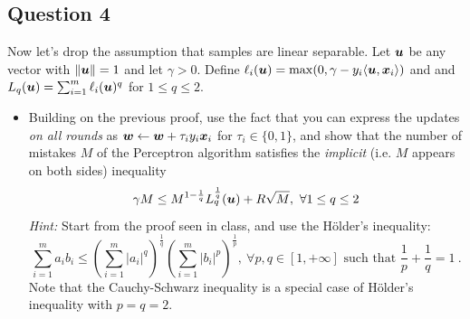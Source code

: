 \documentclass{article}
\begin{document}
\subsection{Question 4}
Now let's drop the assumption that samples are linear separable.
Let $\boldsymbol{u}$ be any vector with $\|\boldsymbol{u}\| = 1$ and let $\gamma > 0$. Define $\ell_i(\boldsymbol{u}) = \max(0, \gamma - y_i\langle \boldsymbol{u}, \boldsymbol{x}_i\rangle)$ and and $L_q(\boldsymbol{u})=\sum_{i=1}^m \ell_i(\boldsymbol{u})^q$ for $1\leq q\leq 2$.
\begin{itemize}
\item Building on the previous proof, use the fact that you can express the updates \emph{on all rounds} as $\boldsymbol{w}\leftarrow \boldsymbol{w} + \tau_i y_i \boldsymbol{x}_i$ for $\tau_i \in \{0,1\}$, and show that the number of mistakes $M$ of the Perceptron algorithm satisfies the \emph{implicit} (i.e. $M$ appears on both sides) inequality
\begin{equation}
\label{eq:implicit_M}
\gamma M\leq M^{1-\frac{1}{q}} L^\frac{1}{q}_q(\bu) + R\sqrt{M}, \ \forall 1 \leq q\leq 2
\end{equation}
\textsl{Hint:} Start from the proof seen in class, and use the H\"{o}lder's inequality:
\[
\sum_{i=1}^m a_i b_i \leq \left(\sum_{i=1}^m |a_i|^q\right)^\frac{1}{q} \left(\sum_{i=1}^m |b_i|^p\right)^\frac{1}{p}, \ \forall p,q\in[1,+\infty] \text{ such that } \frac{1}{p}+\frac{1}{q}=1~.
\]
Note that the Cauchy-Schwarz inequality is a special case of H\"{o}lder's inequality with $p=q=2$.\\


\end{itemize}
\end{document}
